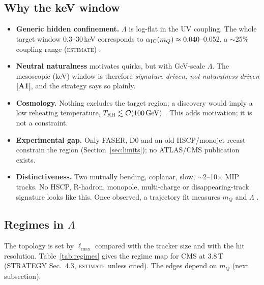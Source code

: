 \documentclass[11pt,a4paper]{article}
\newcommand{\EST}{\textsc{estimate}}
\newcommand{\mQ}{m_Q}
\newcommand{\GeV}{\,\mathrm{GeV}}
\newcommand{\lab}[1]{\textbf{[#1]}}
\begin{document}
\subsection{Why the keV window}
\begin{itemize}
\item \textbf{Generic hidden confinement.} $\Lambda$ is log-flat in the UV coupling. The whole target window 0.3--30\,keV corresponds to $\alpha_{\rm IC}(\mQ)\approx0.040$--0.052, a $\sim$25\% coupling range (\EST) \cite{KL}.
\item \textbf{Neutral naturalness} motivates quirks, but with GeV-scale $\Lambda$. The mesoscopic (keV) window is therefore \emph{signature-driven, not naturalness-driven} \lab{A1}, and the strategy says so plainly.
\item \textbf{Cosmology.} Nothing excludes the target region; a discovery would imply a low reheating temperature, $T_{\rm RH}\lesssim\mathcal{O}(100\GeV)$ \cite{cool}. This adds motivation; it is not a constraint.
\item \textbf{Experimental gap.} Only FASER, D0 and an old HSCP/monojet recast constrain the region (Section~\ref{sec:limits}); no ATLAS/CMS publication exists.
\item \textbf{Distinctiveness.} Two mutually bending, coplanar, slow, $\sim$2--10$\times$ MIP tracks. No HSCP, R-hadron, monopole, multi-charge or disappearing-track signature looks like this. Once observed, a trajectory fit measures $\mQ$ and $\Lambda$ \cite{Knapen}.
\end{itemize}

\subsection{Regimes in $\Lambda$}
The topology is set by $\ell_{\max}$ compared with the tracker size and with the hit resolution. Table~\ref{tab:regimes} gives the regime map for CMS at 3.8\,T (STRATEGY Sec.~4.3, \EST{} unless cited). The edges depend on $\mQ$ (next subsection).
\end{document}
